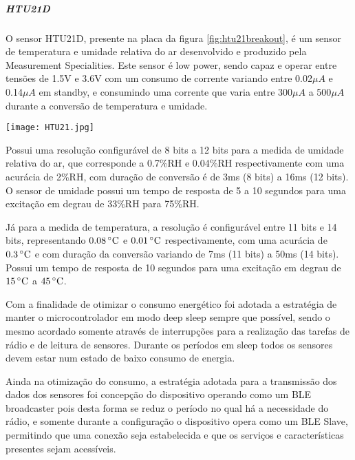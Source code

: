 \subparagraph{HTU21D} O sensor HTU21D, presente na placa da figura
\ref{fig:htu21breakout}, é um sensor de temperatura e umidade relativa do ar
desenvolvido e produzido pela Measurement Specialities. Este sensor é low
power, sendo capaz e operar entre tensões de 1.5V e 3.6V com um consumo de
corrente variando entre 0.02$\mu A$ e 0.14$\mu A$ em standby, e consumindo uma
corrente que varia entre 300$\mu A$ a 500$\mu A$ durante a conversão de
temperatura e umidade. \cite{HTU21DDatasheet}

\begin{center}
	\centering 
	\texttt{[image: HTU21.jpg]}
	\label{fig:htu21breakout}
\end{center} 

Possui uma  resolução configurável de 8 bits a 12 bits para a medida de umidade
relativa do ar, que corresponde a 0.7\%RH e 0.04\%RH respectivamente com uma
acurácia de 2\%RH, com duração de conversão é de 3ms (8 bits) a 16ms (12 bits).
O sensor de umidade possui um tempo de resposta de 5 a 10 segundos para uma
excitação em degrau de 33\%RH para 75\%RH. \cite{HTU21DDatasheet}

Já para a medida de temperatura, a resolução é configurável entre 11 bits e 14
bits, representando $0.08\,^{\circ}{\rm C}$ e $0.01\,^{\circ}{\rm C}$
respectivamente, com uma acurácia de $0.3\,^{\circ}{\rm C}$ e com duração da
conversão variando de 7ms (11 bits) a 50ms (14 bits). Possui um tempo de
resposta de 10 segundos para uma excitação em degrau de $15\,^{\circ}{\rm C}$ a
$45\,^{\circ}{\rm C}$.\cite{HTU21DDatasheet}

Com a finalidade de otimizar o consumo energético foi adotada a estratégia de
manter o microcontrolador em modo deep sleep sempre que possível, sendo o mesmo
acordado somente através de interrupções para a realização das tarefas de rádio
e de leitura de sensores. Durante os períodos em sleep todos os sensores devem
estar num estado de baixo consumo de energia.\cite{MicrochipLPDesign}

Ainda na otimização do consumo, a estratégia adotada para a transmissão dos
dados dos sensores foi concepção do dispositivo operando como um BLE broadcaster
pois desta forma se reduz o período no qual há a necessidade do rádio, e
somente durante a configuração o dispositivo opera como um BLE Slave,
permitindo que uma conexão seja estabelecida e que os serviços e
características presentes sejam acessíveis.

